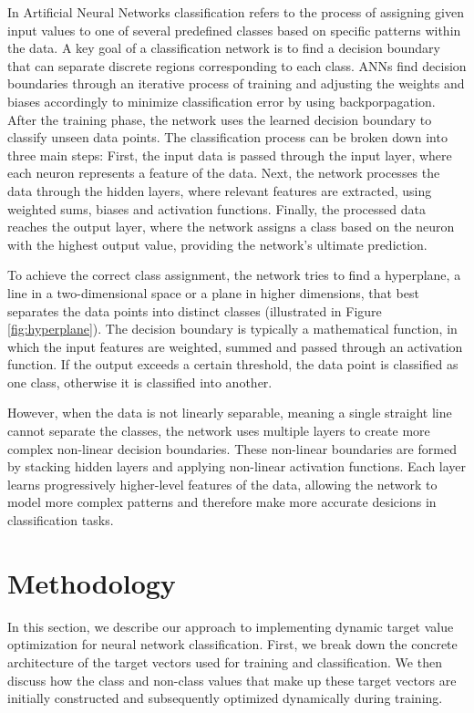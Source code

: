 \documentclass[12pt,fleqn,a4paper]{article}
\begin{document}
In Artificial Neural Networks classification refers to the process of assigning given input values to one of several predefined classes based on specific patterns within the data. A key goal of a classification network is to find a decision boundary that can separate discrete regions corresponding to each class. ANNs find decision boundaries through an iterative process of training and adjusting the weights and biases accordingly to minimize classification error by using backporpagation. After the training phase, the network uses the learned decision boundary to classify unseen data points. The classification process can be broken down into three main steps: First, the input data is passed through the input layer, where each neuron represents a feature of the data. Next, the network processes the data through the hidden layers, where relevant features are extracted, using weighted sums, biases and activation functions. Finally, the processed data reaches the output layer, where the network assigns a class based on the neuron with the highest output value, providing the network's ultimate prediction.

To achieve the correct class assignment, the network tries to find a hyperplane, a line in a two-dimensional space or a plane in higher dimensions, that best separates the data points into distinct classes (illustrated in Figure \ref{fig:hyperplane}). The decision boundary is typically a mathematical function, in which the input features are weighted, summed and passed through an activation function. If the output exceeds a certain threshold, the data point is classified as one class, otherwise it is classified into another.

However, when the data is not linearly separable, meaning a single straight line cannot separate the classes, the network uses multiple layers to create more complex non-linear decision boundaries. These non-linear boundaries are formed by stacking hidden layers and applying non-linear activation functions. Each layer learns progressively higher-level features of the data, allowing the network to model more complex patterns and therefore make more accurate desicions in classification tasks.

\section{Methodology}
In this section, we describe our approach to implementing dynamic target value optimization for neural network classification. First, we break down the concrete architecture of the target vectors used for training and classification. We then discuss how the class and non-class values that make up these target vectors are initially constructed and subsequently optimized dynamically during training.
\end{document}
